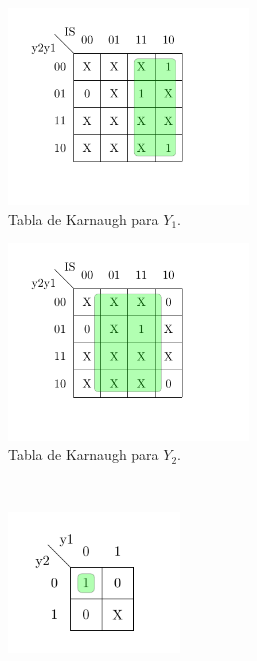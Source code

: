 \begin{figure}[H]
\centering
\begin{subfigure}{.49\textwidth}
\centering
	\includegraphics[width=0.7\textwidth]{ImagenesEjercicio1/Mapa1.pdf}
	\caption{Tabla de Karnaugh para $Y_1$.}
	\label{fig:fsm1}
\end{subfigure}
\begin{subfigure}{.49\textwidth}
\centering
	\includegraphics[width=0.7\textwidth]{ImagenesEjercicio1/Mapa2.pdf}
	\caption{Tabla de Karnaugh para $Y_2$.}
	\label{fig:fsm2}
\end{subfigure} \\
\begin{subfigure}{.49\textwidth}
\centering
	\includegraphics[width=0.5\textwidth]{ImagenesEjercicio1/Mapa3.pdf}

\end{subfigure}
\end{figure}
